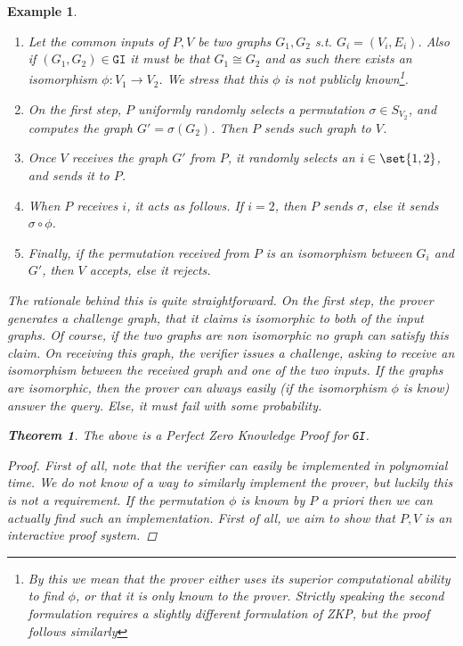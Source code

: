 \documentclass{article}
\newtheorem{theorem}{Theorem}
\newtheorem{example}{Example}
\begin{document}
\begin{example}
    \begin{enumerate}
        \item Let the common inputs of $P, V$ be two graphs $G_1, G_2$ s.t. $G_i = (V_i, E_i)$.
              Also if $(G_1, G_2) \in \texttt{GI}$ it must be that $G_1 \cong G_2$ and as such there exists an
              isomorphism $\phi : V_1 \to V_2$. We stress that this $\phi$ is not publicly known\footnote{By this we mean that the prover either uses its superior computational ability to find $\phi$, or that it is only known to the prover. Strictly speaking the second formulation requires a slightly different formulation of ZKP, but the proof follows similarly }.
        \item On the first step, $P$ uniformly randomly selects a permutation $\sigma \in S_{V_2}$, and computes the graph $G' = \sigma(G_2)$.
              Then $P$ sends such graph to $V$.
        \item Once $V$ receives the graph $G'$ from $P$, it randomly selects an $i \in \set{1, 2}$, and sends it to $P$.
        \item When $P$ receives $i$, it acts as follows. If $i = 2$, then $P$ sends $\sigma$, else it sends $\sigma \circ \phi$.
        \item Finally, if the permutation received from $P$ is an isomorphism between $G_i$ and $G'$, then $V$ accepts, else it rejects.
    \end{enumerate}
    The rationale behind this is quite straightforward. On the first step, the prover generates a challenge graph, that it claims is isomorphic to both of the input graphs.
    Of course, if the two graphs are non isomorphic no graph can satisfy this claim. On receiving this graph, the verifier issues a challenge, asking to receive an isomorphism between the received graph and one of the two inputs.
    If the graphs are isomorphic, then the prover can always easily (if the isomorphism $\phi$ is know) answer the query. Else, it must fail with some probability.
    \begin{theorem}
        The above is a Perfect Zero Knowledge Proof for \texttt{GI}.
    \end{theorem}
    \begin{proof}
        First of all, note that the verifier can easily be implemented in polynomial time. We do not know of a way to similarly implement the prover,
        but luckily this is not a requirement. If the permutation $\phi$ is known by $P$ a priori then we can actually find such an implementation.
        First of all, we aim to show that $P, V$ is an interactive proof system.

\end{proof}
\end{example}
\end{document}
